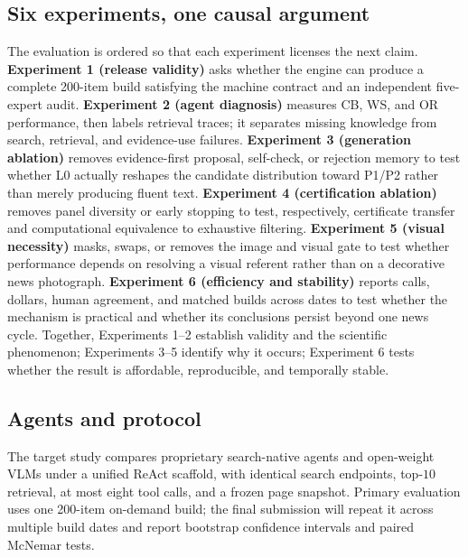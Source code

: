 \documentclass{article}
\begin{document}
\subsection{Six experiments, one causal argument}
The evaluation is ordered so that each experiment licenses the next claim.
\textbf{Experiment 1 (release validity)} asks whether the engine can produce a
complete 200-item build satisfying the machine contract and an independent
five-expert audit.
\textbf{Experiment 2 (agent diagnosis)} measures CB, WS, and OR performance,
then labels retrieval traces; it separates missing knowledge from search,
retrieval, and evidence-use failures.
\textbf{Experiment 3 (generation ablation)} removes evidence-first proposal,
self-check, or rejection memory to test whether L0 actually reshapes the
candidate distribution toward P1/P2 rather than merely producing fluent text.
\textbf{Experiment 4 (certification ablation)} removes panel diversity or
early stopping to test, respectively, certificate transfer and computational
equivalence to exhaustive filtering.
\textbf{Experiment 5 (visual necessity)} masks, swaps, or removes the image and
visual gate to test whether performance depends on resolving a visual referent
rather than on a decorative news photograph.
\textbf{Experiment 6 (efficiency and stability)} reports calls, dollars, human
agreement, and matched builds across dates to test whether the mechanism is
practical and whether its conclusions persist beyond one news cycle.
Together, Experiments 1--2 establish validity and the scientific phenomenon;
Experiments 3--5 identify why it occurs; Experiment 6 tests whether the result
is affordable, reproducible, and temporally stable.

\subsection{Agents and protocol}
The target study compares proprietary search-native agents and open-weight
VLMs under a unified ReAct scaffold, with identical search endpoints,
top-$10$ retrieval, at most eight tool calls, and a frozen page snapshot.
Primary evaluation uses one 200-item on-demand build; the final submission
will repeat it across multiple build dates and report bootstrap confidence
intervals and paired McNemar tests.
\end{document}
